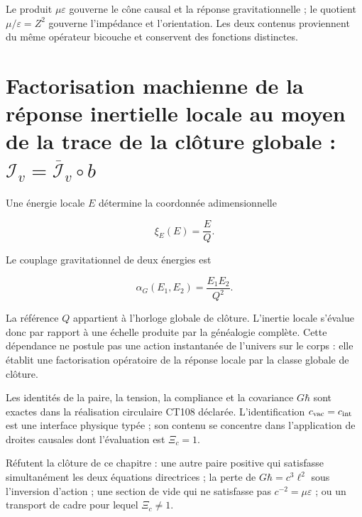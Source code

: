 Le produit \(\mu\varepsilon\) gouverne le cône causal et la réponse
gravitationnelle ; le quotient \(\mu/\varepsilon=Z^2\) gouverne l'impédance et
l'orientation. Les deux contenus proviennent du même opérateur bicouche et conservent
des fonctions distinctes.

\section{Factorisation machienne de la réponse inertielle locale au moyen de la trace de la clôture globale : \(\mathcal I_v=\overline{\mathcal I}_v\circ b\)}

Une énergie locale \(E\) détermine la coordonnée adimensionnelle

\[
\xi_E(E)=\frac{E}{Q}.
\]

Le couplage gravitationnel de deux énergies est

\begin{equation}
\alpha_G(E_1,E_2)=\frac{E_1E_2}{Q^2}.
\label{eq:rm-mach-coupling}
\end{equation}

La référence \(Q\) appartient à l'horloge globale de clôture. L'inertie locale
s'évalue donc par rapport à une échelle produite par la généalogie complète.
Cette dépendance ne postule pas une action instantanée de l'univers sur le
corps : elle établit une factorisation opératoire de la réponse locale par la
classe globale de clôture.

\begin{proofstatusbox}
Les identités de la paire, la tension, la compliance et la covariance
\(G\hbar\) sont exactes dans la réalisation circulaire CT108 déclarée.
L'identification \(c_{\rm vac}=c_{\rm int}\) est une interface physique typée ;
son contenu se concentre dans l'application de droites causales dont l'évaluation est
\(\Xi_c=1\).
\end{proofstatusbox}

\begin{falsifierbox}
Réfutent la clôture de ce chapitre : une autre paire positive qui
satisfasse simultanément les deux équations directrices ; la perte de
\(G\hbar=c^3\ell^2\) sous l'inversion d'action ; une section de vide
qui ne satisfasse pas \(c^{-2}=\mu\varepsilon\) ; ou un transport de cadre pour lequel
\(\Xi_c\ne1\).
\end{falsifierbox}
